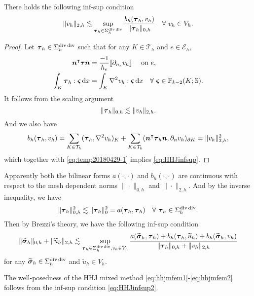 \begin{lemma}
There holds the following inf-sup condition
\begin{equation}\label{eq:HHJinfsup}
\|v_h\|_{2,h}\lesssim \sup_{\boldsymbol\tau_h\in\Sigma_h^{\operatorname{div}\operatorname{div}}}\frac{b_h(\boldsymbol\tau_h, v_h)}{\|\boldsymbol\tau_h\|_{0,h}}\quad\forall~v_h\in V_h.
\end{equation}
\end{lemma}
\begin{proof}
Let $\boldsymbol\tau_h\in\Sigma_h^{\operatorname{div}\operatorname{div}}$ such that for any $K\in\mathcal T_h$ and $e\in\mathcal E_h$,
\begin{align*}
\boldsymbol{n}^{\intercal}\boldsymbol\tau\boldsymbol{n}&=\frac{-1}{h_e}\llbracket\partial_{n_e}v_h\rrbracket\quad\textrm{ on  } e,
\\
\int_K\boldsymbol\tau_h:\boldsymbol\varsigma\,{\rm d}x&=\int_K\nabla^2v_h:\boldsymbol\varsigma\,{\rm d}x\quad\forall~\boldsymbol\varsigma\in \mathbb P_{k-2}(K;\mathbb S).
\end{align*}
It follows from the scaling argument
\begin{equation}\label{eq:temp20180429-1}
\|\boldsymbol\tau_h\|_{0,h}\lesssim \|v_h\|_{2,h}.
\end{equation}
And we also have
\[
b_h(\boldsymbol\tau_h, v_h)=\sum_{K\in\mathcal T_h}(\boldsymbol\tau_h, \nabla^2v_h)_K+\sum_{K\in\mathcal T_h}(\boldsymbol{n}^{\intercal}\boldsymbol\tau_h\boldsymbol{n}, \partial_{n} v_h)_{\partial K}=\|v_h\|_{2,h}^2,
\]
which together with \eqref{eq:temp20180429-1} implies \eqref{eq:HHJinfsup}.
\end{proof}

Apparently both the bilinear forms $a(\cdot, \cdot)$ and $b_h(\cdot, \cdot)$ are continuous with respect to the
mesh dependent norms $\|\cdot\|_{0,h}$ and $\|\cdot\|_{2,h}$. And by the inverse inequality, we have
\[
\|\boldsymbol\tau_h\|_{0,h}^2\lesssim \|\boldsymbol\tau_h\|_0^2=a(\boldsymbol\tau_h,\boldsymbol\tau_h)\quad\forall~\boldsymbol\tau_h\in\Sigma_h^{\operatorname{div}\operatorname{div}}.
\]
Then
by Brezzi's theory, we have the following inf-sup condition
\begin{equation}\label{eq:HHJinfsup2}
\|\widetilde{\boldsymbol\sigma}_h\|_{0,h}+\|\widetilde{u}_h\|_{2,h}\lesssim \sup_{\boldsymbol\tau_h\in\Sigma_h^{\operatorname{div}\operatorname{div}}, v_h\in V_h}\frac{a(\widetilde{\boldsymbol\sigma}_h, \boldsymbol\tau_h)+ b_h(\boldsymbol\tau_h, \widetilde{u}_h)+b_h(\widetilde{\boldsymbol\sigma}_h, v_h)}{\|\boldsymbol\tau_h\|_{0,h}+\|v_h\|_{2,h}}
\end{equation}
for any $\widetilde{\boldsymbol\sigma}_h\in\Sigma_h^{\operatorname{div}\operatorname{div}}$ and $\widetilde{u}_h\in V_h$.

The well-posedness of the HHJ mixed method \eqref{eq:hhjmfem1}-\eqref{eq:hhjmfem2} follows from the inf-sup condition \eqref{eq:HHJinfsup2}.

